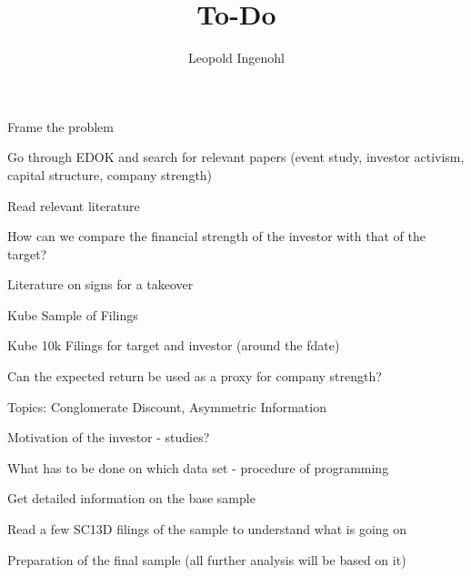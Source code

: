 \documentclass{article}
\title{To-Do}
\author{Leopold Ingenohl}
\newcommand{\cmark}{\ding{51}}%
\newcommand{\done}{\rlap{$\square$}{\raisebox{2pt}{\large\hspace{1pt}\cmark}}%
\hspace{-2.5pt}}
\begin{document}
\maketitle


  \begin{todolist}
  \item[\done] Frame the problem
  \end{todolist}

\begin{todolist}

  \item [\done] Go through EDOK and search for relevant papers (event study, investor activism, capital structure, company strength)
  \item Read relevant literature
  \item How can we compare the financial strength of the investor with that of the target?
  \item Literature on signs for a takeover
  \item Kube Sample of Filings
  \item Kube 10k Filings for target and investor (around the fdate)
  \item Can the expected return be used as a proxy for company strength? 
  \item Topics: Conglomerate Discount, Asymmetric Information
  \item Motivation of the investor - studies?
  \item What has to be done on which data set - procedure of programming 
  \item Get detailed information on the base sample 
  \item Read a few SC13D filings of the sample to understand what is going on
  \item Preparation of the final sample (all further analysis will be based on it)



\end{todolist}
\end{document}

